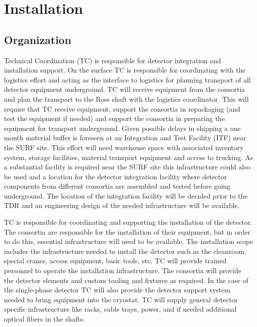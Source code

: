 \section{Installation}
\label{sec:fdsp-coord-install}

\subsection{Organization}
\label{sec:fdsp-coord-org}

Technical Coordination (TC) is responsible for detector integration
and installation support. On the surface TC is responsible for
coordinating with the  logistics effort and acting as the
interface to  logistics for planning transport of all detector
equipment underground. TC will receive equipment from the consortia
and plan the transport to the Ross shaft with the  logistics
coordinator. This will require that TC receive equipment, support the
consortia in repackaging (and test the equipment if needed) and
support the consortia in preparing the equipment for transport
underground. Given possible delays in shipping a one month material
buffer is foreseen at an Integration and Test Facility (ITF) near the
SURF site. This effort will need warehouse space with associated
inventory system, storage facilities, material transport equipment and
access to trucking. As a substantial facility is required near the
SURF site this infrastructure could also be used and a location for
the detector integration facility where detector components from
different consortia are assembled and tested before going
underground. The location of the integration facility will be decided
prior to the TDR and an engineering design of the needed
infrastructure will be available.

TC is responsible for coordinating and supporting the installation of
the detector. The consortia are responsible for the installation of
their equipment, but in order to do this, essential infrastructure
will need to be available. The installation scope includes the
infrastructure needed to install the detector such as the cleanroom,
special cranes, access equipment, basic tools, etc. TC will provide
trained personnel to operate the installation infrastructure. The
consortia will provide the detector elements and custom tooling and
fixtures as required. In the case of the single-phase detector TC will
also provide the detector support system needed to bring equipment
into the cryostat. TC will supply general detector specific
infrastructure like racks, cable trays, power, and if needed
additional optical fibers in the shafts.

